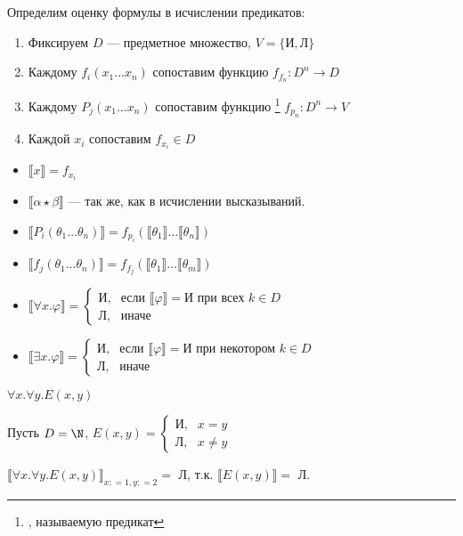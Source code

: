 Определим оценку формулы в исчислении предикатов:

\begin{enumerate}
    \item Фиксируем \(D\) --- предметное множество, \(V = \{\text{И}, \text{Л}\} \)
    \item Каждому \(f_i(x_1 \dots x_n)\) сопоставим функцию \(f_{f_n} : D^n \to D\)
    \item Каждому \(P_j(x_1 \dots x_n)\) сопоставим функцию \footnote{,  называемую предикат} \(f_{p_n} : D^n \to V\)
    \item Каждой \(x_i\) сопоставим \(f_{x_i}\in D\)
\end{enumerate}

\begin{itemize}
    \item \(\llbracket x \rrbracket = f_{x_i}\)
    \item \(\llbracket \alpha \star \beta \rrbracket\) --- так же, как в исчислении высказываний.
    \item \(\llbracket P_i(\theta_1 \dots \theta_n) \rrbracket = f_{p_i}(\llbracket \theta_1 \rrbracket \dots \llbracket \theta_n \rrbracket)\)
    \item \(\llbracket f_j(\theta_1 \dots \theta_n) \rrbracket = f_{f_j}(\llbracket \theta_1 \rrbracket \dots \llbracket \theta_m \rrbracket)\)
    \item \(\llbracket \forall x.\varphi \rrbracket = \begin{cases} \text{И}, & \text{если } \llbracket \varphi \rrbracket = \text{И} \text{ при всех } k\in D \\
              \text{Л}, & \text{иначе}
          \end{cases} \)
    \item \(\llbracket \exists x.\varphi \rrbracket = \begin{cases} \text{И}, & \text{если } \llbracket \varphi \rrbracket = \text{И} \text{ при некотором } k\in D \\
              \text{Л}, & \text{иначе}
          \end{cases} \)
\end{itemize}

\begin{example}
    \(\forall x.\forall y.E(x, y)\)

    Пусть \(D = \N\), \(E(x, y) = \begin{cases} \text{И}, & x = y \\ \text{Л}, & x \neq y \end{cases} \)

    \(\llbracket\forall x.\forall y.E(x, y)\rrbracket_{x: = 1, y: = 2} =\) Л, т.к. \(\llbracket E(x, y) \rrbracket =\) Л.
\end{example}

